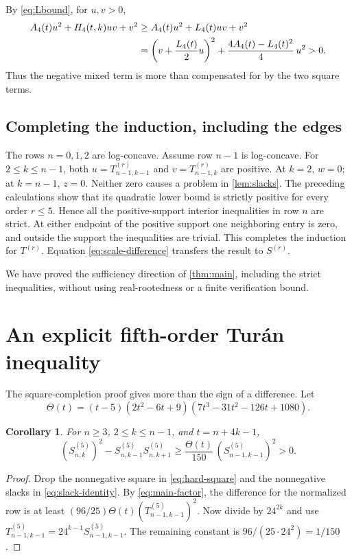 \documentclass[11pt,a4paper]{article}
\numberwithin{equation}{section}
\newtheorem{corollary}[corollary]{Corollary}
\theoremstyle{definition}
\theoremstyle{remark}
\newcommand{\Snum}[3]{S^{(#1)}_{#2,#3}}
\newcommand{\Turan}{Tur\'an}
\begin{document}
By \eqref{eq:Lbound}, for $u,v>0$,
\begin{align}
 A_4(t)u^2+H_4(t,k)uv+v^2
 &\ge A_4(t)u^2+L_4(t)uv+v^2\notag\\
 &=\left(v+\frac{L_4(t)}2u\right)^2
       +\frac{4A_4(t)-L_4(t)^2}{4}\,u^2
 >0.\label{eq:hard-square}
\end{align}
Thus the negative mixed term is more than compensated for by the two
square terms.

\subsection{Completing the induction, including the edges}

The rows $n=0,1,2$ are log-concave. Assume row $n-1$ is log-concave.
For $2\le k\le n-1$, both $u=T^{(r)}_{n-1,k-1}$ and
$v=T^{(r)}_{n-1,k}$ are positive. At $k=2$, $w=0$; at $k=n-1$, $z=0$.
Neither zero causes a problem in \cref{lem:slacks}. The preceding calculations
show that its quadratic lower bound is strictly positive for every order
$r\le5$. Hence all the positive-support interior inequalities in row $n$
are strict. At either endpoint of the positive support one neighboring
entry is zero, and outside the support the inequalities are trivial.
This completes the induction for $T^{(r)}$. Equation
\eqref{eq:scale-difference} transfers the result to $S^{(r)}$.

We have proved the sufficiency direction of \cref{thm:main}, including the strict
inequalities, without using real-rootedness or a finite verification bound.

\section{An explicit fifth-order \Turan{} inequality}\label{sec:quantitative}

The square-completion proof gives more than the sign of a difference.
Let
\begin{equation}\label{eq:Theta}
 \Theta(t)=(t-5)(2t^2-6t+9)(7t^3-31t^2-126t+1080).
\end{equation}

\begin{corollary}\label{cor:quantitative}
For $n\ge3$, $2\le k\le n-1$, and $t=n+4k-1$,
\begin{equation}\label{eq:quantitative}
 (\Snum5nk)^2-\Snum5n{k-1}\Snum5n{k+1}
 \ge\frac{\Theta(t)}{150}\,(\Snum5{n-1}{k-1})^2>0.
\end{equation}
\end{corollary}
\begin{proof}
Drop the nonnegative square in \eqref{eq:hard-square} and the nonnegative
slacks in \eqref{eq:slack-identity}. By \eqref{eq:main-factor}, the difference
for the normalized row is at least
$(96/25)\Theta(t)(T^{(5)}_{n-1,k-1})^2$.
Now divide by $24^{2k}$ and use
$T^{(5)}_{n-1,k-1}=24^{k-1}S^{(5)}_{n-1,k-1}$.
The remaining constant is $96/(25\cdot24^2)=1/150$.
\end{proof}
\end{document}
